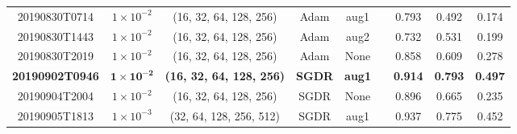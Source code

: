 \begin{table}[!ht]
\begin{adjustbox}{width=\columnwidth, center}
\begin{tabular}{ccccccccc}
			20190830T0714                        & $1\times10^{-2}$                                   & (16, 32, 64, 128, 256)                      & Adam                                & aug1                                                                                      & \xmark                                                                                     & 0.793          & 0.492          & 0.174          \\
			20190830T1443                        & $1\times10^{-2}$                                   & (16, 32, 64, 128, 256)                      & Adam                                & aug2                                                                                      & \xmark                                                                                     & 0.732          & 0.531          & 0.199          \\
			20190830T2019                        & $1\times10^{-2}$                                   & (16, 32, 64, 128, 256)                      & Adam                                & None                                                                                      & \xmark                                                                                     & 0.858          & 0.609          & 0.278          \\
			\textbf{20190902T0946}               & $\mathbf{1\times10^{-2}}$                         & \textbf{(16, 32, 64, 128, 256)}             & \textbf{SGDR}                       & \textbf{aug1}                                                                             & \textbf{\cmark}                                                                            & \textbf{0.914} & \textbf{0.793} & \textbf{0.497} \\
			20190904T2004                        & $1\times10^{-2}$                                   & (16, 32, 64, 128, 256)                      & SGDR                                & None                                                                                      & \cmark                                                                                     & 0.896          & 0.665          & 0.235          \\
			20190905T1813                        & $1\times10^{-3}$                                  & (32, 64, 128, 256, 512)                     & SGDR                                & aug1                                                                                      & \cmark                                                                                     & 0.937          & 0.775          & 0.452          \\

\end{tabular}
\end{adjustbox}
\end{table}
